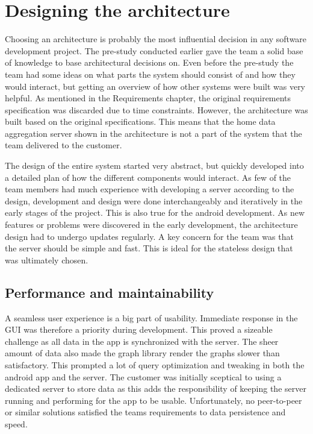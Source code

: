\section{Designing the architecture}
Choosing an architecture is probably the most influential decision in any software development project. The pre-study conducted earlier gave the team a solid base of knowledge to base architectural 
decisions on. Even before the pre-study the team had some ideas on what parts the system should consist of and how they would interact, but getting an overview of how other systems were built was 
very helpful. As mentioned in the Requirements chapter, the original requirements specification was discarded due to time constraints. However, the architecture was built based on the original 
specifications. This means that the home data aggregation server shown in the architecture is not a part of the system that the team delivered to the customer.

The design of the entire system started very abstract, but quickly developed into a detailed plan of how the different components would interact. As few of the team members had much 
experience with developing a server according to the design, development and design were done interchangeably and iteratively in the early stages of the project. This is also true for the 
android development. As new features or problems were discovered in the early development, the architecture design had to undergo updates regularly. A key concern for the team was that the 
server should be simple and fast. This is ideal for the stateless design that was ultimately chosen. 

\subsection{Performance and maintainability}
A seamless user experience is a big part of usability. Immediate response in the GUI was therefore a priority during development. This proved a sizeable challenge as all data in the 
app is synchronized with the server. The sheer amount of data also made the graph library render the graphs slower than satisfactory. This prompted a lot of query optimization and tweaking 
in both the android app and the server. The customer was initially sceptical to using a dedicated server to store data as this adds the responsibility of keeping the server running and performing 
for the app to be usable. Unfortunately, no peer-to-peer or similar solutions satisfied the teams requirements to data persistence and speed.

